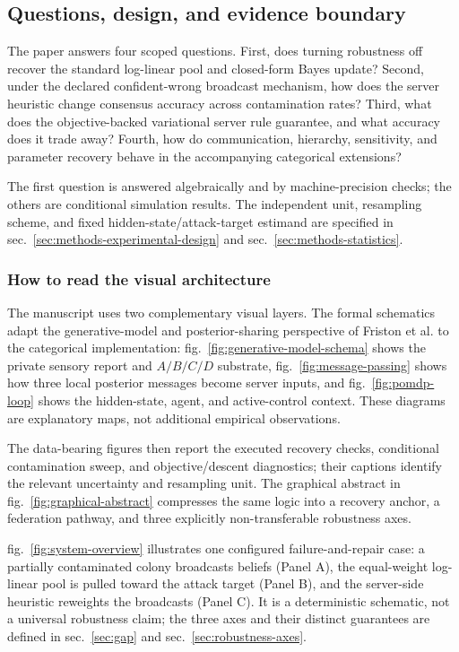 \documentclass[
  english,
]{article}
\theoremstyle{plain}
\theoremstyle{definition}
\theoremstyle{remark}
\theoremstyle{definition}
\begin{document}
\subsection{Questions, design, and evidence
boundary}\label{sec:intro-questions}

The paper answers four scoped questions. First, does turning robustness
off recover the standard log-linear pool and closed-form Bayes update?
Second, under the declared confident-wrong broadcast mechanism, how does
the server heuristic change consensus accuracy across contamination
rates? Third, what does the objective-backed variational server rule
guarantee, and what accuracy does it trade away? Fourth, how do
communication, hierarchy, sensitivity, and parameter recovery behave in
the accompanying categorical extensions?

The first question is answered algebraically and by machine-precision
checks; the others are conditional simulation results. The independent
unit, resampling scheme, and fixed hidden-state/attack-target estimand
are specified in sec.~\ref{sec:methods-experimental-design} and
sec.~\ref{sec:methods-statistics}.

\subsubsection{How to read the visual
architecture}\label{sec:intro-visual-map}

The manuscript uses two complementary visual layers. The formal
schematics adapt the generative-model and posterior-sharing perspective
of Friston et al. \citeyearpar{friston2024federated} to the categorical
implementation: fig.~\ref{fig:generative-model-schema} shows the private
sensory report and \(A/B/C/D\) substrate, fig.~\ref{fig:message-passing}
shows how three local posterior messages become server inputs, and
fig.~\ref{fig:pomdp-loop} shows the hidden-state, agent, and
active-control context. These diagrams are explanatory maps, not
additional empirical observations.

The data-bearing figures then report the executed recovery checks,
conditional contamination sweep, and objective/descent diagnostics;
their captions identify the relevant uncertainty and resampling unit.
The graphical abstract in fig.~\ref{fig:graphical-abstract} compresses
the same logic into a recovery anchor, a federation pathway, and three
explicitly non-transferable robustness axes.

fig.~\ref{fig:system-overview} illustrates one configured
failure-and-repair case: a partially contaminated colony broadcasts
beliefs (Panel A), the equal-weight log-linear pool is pulled toward the
attack target (Panel B), and the server-side heuristic reweights the
broadcasts (Panel C). It is a deterministic schematic, not a universal
robustness claim; the three axes and their distinct guarantees are
defined in sec.~\ref{sec:gap} and sec.~\ref{sec:robustness-axes}.
\end{document}
